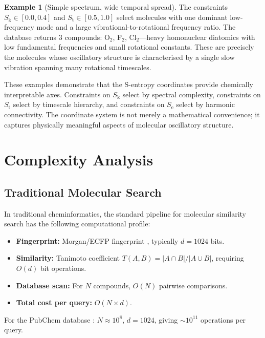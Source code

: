 \documentclass[11pt,twocolumn,a4paper]{article}
\theoremstyle{definition}
\newtheorem{example}[theorem]{Example}
\theoremstyle{remark}
\newcommand{\Sk}{S_{\mathrm{k}}}
\newcommand{\St}{S_{\mathrm{t}}}
\newcommand{\Se}{S_{\mathrm{e}}}
\begin{document}
\begin{example}[Simple spectrum, wide temporal spread]
The constraints $\Sk \in [0.0, 0.4]$ and $\St \in [0.5, 1.0]$ select molecules with one dominant low-frequency mode and a large vibrational-to-rotational frequency ratio. The database returns 3 compounds: O$_2$, F$_2$, Cl$_2$---heavy homonuclear diatomics with low fundamental frequencies and small rotational constants. These are precisely the molecules whose oscillatory structure is characterised by a single slow vibration spanning many rotational timescales.
\end{example}

These examples demonstrate that the S-entropy coordinates provide chemically interpretable axes. Constraints on $\Sk$ select by spectral complexity, constraints on $\St$ select by timescale hierarchy, and constraints on $\Se$ select by harmonic connectivity. The coordinate system is not merely a mathematical convenience; it captures physically meaningful aspects of molecular oscillatory structure.

\section{Complexity Analysis}
\label{sec:complexity}

\subsection{Traditional Molecular Search}

In traditional cheminformatics, the standard pipeline for molecular similarity search has the following computational profile:

\begin{itemize}[nosep]
\item \textbf{Fingerprint:} Morgan/ECFP fingerprint \citep{rogers2010}, typically $d = 1024$ bits.
\item \textbf{Similarity:} Tanimoto coefficient $T(A,B) = |A \cap B|/|A \cup B|$, requiring $O(d)$ bit operations.
\item \textbf{Database scan:} For $N$ compounds, $O(N)$ pairwise comparisons.
\item \textbf{Total cost per query:} $O(N \times d)$.
\end{itemize}

For the PubChem database \citep{kim2023}: $N \approx 10^8$, $d = 1024$, giving $\sim 10^{11}$ operations per query.
\end{document}
